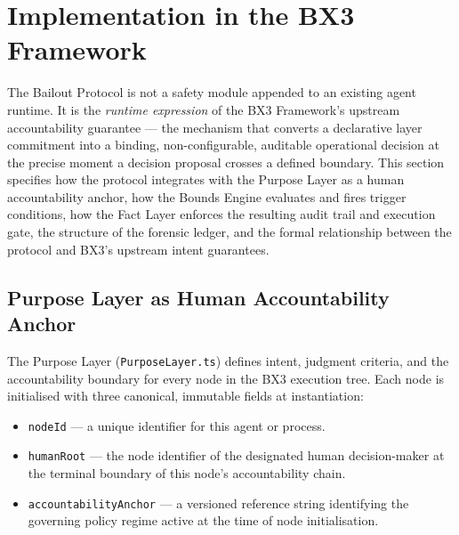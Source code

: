 
\section{Implementation in the BX3 Framework}
\label{sec:bailout-implementation}

The Bailout Protocol is not a safety module appended to an existing agent runtime. It is the \emph{runtime expression} of the BX3 Framework's upstream accountability guarantee --- the mechanism that converts a declarative layer commitment into a binding, non-configurable, auditable operational decision at the precise moment a decision proposal crosses a defined boundary. This section specifies how the protocol integrates with the Purpose Layer as a human accountability anchor, how the Bounds Engine evaluates and fires trigger conditions, how the Fact Layer enforces the resulting audit trail and execution gate, the structure of the forensic ledger, and the formal relationship between the protocol and BX3's upstream intent guarantees.

\subsection{Purpose Layer as Human Accountability Anchor}
\label{sec:purpose-layer-anchor}

The Purpose Layer (\texttt{PurposeLayer.ts}) defines intent, judgment criteria, and the accountability boundary for every node in the BX3 execution tree. Each node is initialised with three canonical, immutable fields at instantiation:

\begin{itemize}
  \item \texttt{nodeId} --- a unique identifier for this agent or process.
  \item \texttt{humanRoot} --- the node identifier of the designated human decision-maker at the terminal boundary of this node's accountability chain.
  \item \texttt{accountabilityAnchor} --- a versioned reference string identifying the governing policy regime active at the time of node initialisation.
\end{itemize}

